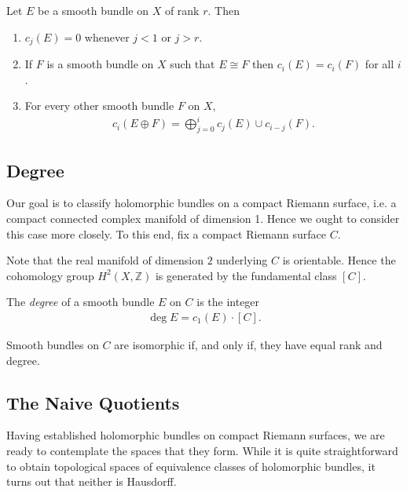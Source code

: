 \documentclass[12pt]{ociamthesis}  %
\begin{document}
\begin{lemma}\missingcitation
  Let $E$ be a smooth bundle on $X$ of rank $r$. Then
  \begin{enumerate}
    \item $c_j(E) = 0$ whenever $j<1$ or $j>r$.
    \item If $F$ is a smooth bundle on $X$ such that $E\cong F$
          then $c_i(E) = c_i(F)$ for all $i$.
    \item For every other smooth bundle $F$ on $X$,
          \begin{align*}
            c_i(E\oplus F) = \bigoplus_{j=0}^{i} c_j(E)\cup c_{i-j}(F).
          \end{align*}
  \end{enumerate}
\end{lemma}

\subsection{Degree}

Our goal is to classify holomorphic bundles on a compact Riemann surface,
i.e. a compact connected complex manifold of dimension 1. Hence we
ought to consider this case more closely. To this end, fix a compact
Riemann surface $C$.


Note that the real manifold of dimension $2$ underlying $C$ is orientable. \missingcitation
Hence the cohomology group $H^2(X,\mathbb{Z})$ is generated by the
fundamental class $[C]$.

\begin{definition}
  The \emph{degree} of a smooth bundle $E$ on $C$ is the integer
  \begin{align*}
    \deg E = c_1(E)\cdot[C].
  \end{align*}
\end{definition}

\begin{theorem}
  Smooth bundles on $C$ are isomorphic if, and only if, they have
  equal rank and degree.
\end{theorem}

\missingsection



\subsection{The Naive Quotients}

Having established holomorphic bundles on compact Riemann surfaces,
we are ready to contemplate the spaces that they form. While it is
quite straightforward to obtain topological spaces of equivalence
classes of holomorphic bundles, it turns out that neither is Hausdorff.
\end{document}
